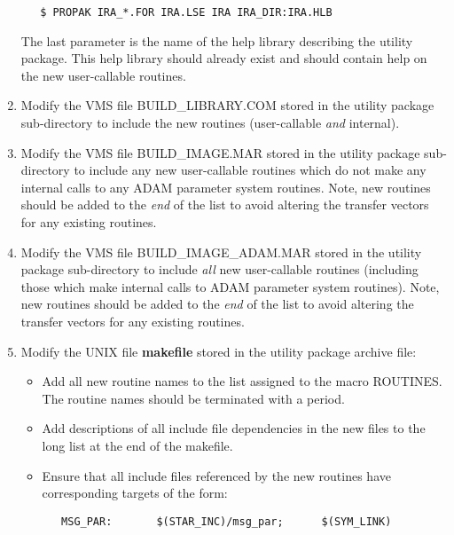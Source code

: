 \begin{enumerate}
\small
\begin{verbatim}
   $ PROPAK IRA_*.FOR IRA.LSE IRA IRA_DIR:IRA.HLB
\end{verbatim}
\normalsize

The last parameter is the name of the help library describing the utility
package. This help library should already exist and should contain help on the
new user-callable routines.

\item Modify the {\small VMS} file {\small BUILD\_LIBRARY.COM} stored in the
utility package sub-directory to include the new routines (user-callable {\em
and} internal).

\item Modify the {\small VMS} file {\small BUILD\_IMAGE.MAR} stored in the
utility package sub-directory to include any new user-callable routines which do
not make any internal calls to any {\small ADAM} parameter system routines.
Note, new routines should be added to the {\em end} of the list to avoid
altering the transfer vectors for any existing routines.

\item Modify the {\small VMS} file {\small BUILD\_IMAGE\_ADAM.MAR} stored in the
utility package sub-directory to include {\em all} new user-callable routines
(including those which make internal calls to {\small ADAM} parameter system
routines). Note, new routines should be added to the {\em end} of the list to
avoid altering the transfer vectors for any existing routines.

\item Modify the {\small UNIX} file {\bf makefile} stored in the
utility package archive file:

\begin{itemize}
\item Add all new routine names to the list assigned to the macro {\small ROUTINES}.
The routine names should be terminated with a period.

\item Add descriptions of all include file dependencies in the new files to the
long list at the end of the makefile.

\item Ensure that all include files referenced by the new routines have
corresponding targets of the form:

\small
\begin{verbatim}
   MSG_PAR:       $(STAR_INC)/msg_par;      $(SYM_LINK)
\end{verbatim}
\normalsize


\end{itemize}
\end{enumerate}
